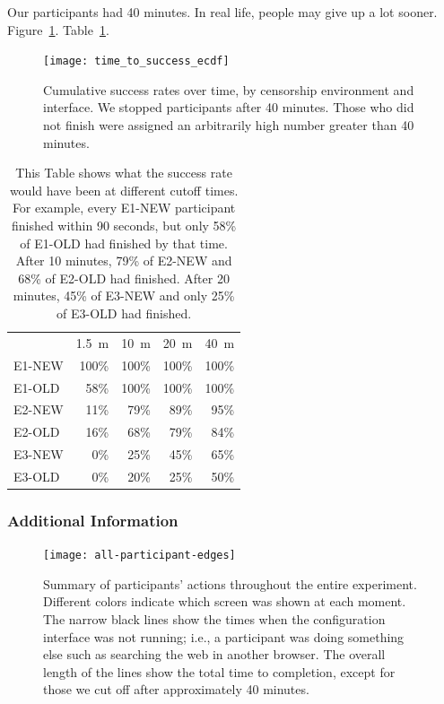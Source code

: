 \documentclass[USenglish,oneside,twocolumn]{article}
\begin{document}
Our participants had 40 minutes. In real life, people may give up a lot sooner. 
Figure~\ref{fig:time_to_success_ecdf}. Table~\ref{table:less_time}.

\begin{figure}
\centering
\texttt{[image: time\_to\_success\_ecdf]}
\caption{
Cumulative success rates over time, by censorship environment and interface.
We stopped participants after 40 minutes. Those who did not finish were assigned
an arbitrarily high number greater than 40 minutes. 
}
\label{fig:time_to_success_ecdf}
\end{figure}

\begin{table}
\centering 
	\begin{tabular}{l r r r r}
	& \multicolumn{1}{c}{1.5~m} & \multicolumn{1}{c}{10~m} & \multicolumn{1}{c}{20~m} & \multicolumn{1}{c}{40~m} \\
	\noalign{\hrule}
	E1-NEW & 100\% & 100\% & 100\% & 100\% \\
	E1-OLD & 58\% & 100\% & 100\% & 100\% \\
	E2-NEW & 11\% & 79\% & 89\% & 95\% \\
	E2-OLD & 16\% & 68\% & 79\% & 84\% \\
	E3-NEW & 0\% & 25\% & 45\% & 65\% \\
	E3-OLD & 0\% & 20\% & 25\% & 50\% \\
	\end{tabular}
\caption{This Table shows what the success rate would have been
at different cutoff times.
For example, every E1-NEW participant finished within 90 seconds,
but only 58\% of E1-OLD had finished by that time.
After 10 minutes, 79\% of E2-NEW and 68\% of E2-OLD had finished.
After 20 minutes, 45\% of E3-NEW and only 25\% of E3-OLD had finished.}
\label{table:less_time}
\end{table}

\subsubsection{Additional Information} 

\begin{figure}
\centering
\texttt{[image: all-participant-edges]}
\caption{
Summary of participants' actions throughout the entire experiment.
Different colors indicate which screen was shown at each moment.
The narrow black lines show the times when the configuration interface
was not running; i.e., a participant was doing something else
such as searching the web in another browser.
The overall length of the lines show the total time to completion,
except for those we cut off after approximately 40 minutes.
}
\label{fig:all-participant-edges}
\end{figure}
\end{document}

